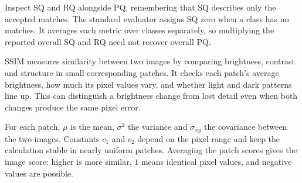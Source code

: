 \metricsecondary

Inspect SQ and RQ alongside PQ, remembering that SQ describes only the accepted matches. The standard evaluator assigns SQ zero when a class has no matches. It averages each metric over classes separately, so multiplying the reported overall SQ and RQ need not recover overall PQ.


\metricend
\clearpage
\thispagestyle{cvstyle}
\label{sec:ssim}

SSIM measures similarity between two images by comparing brightness, contrast and structure in small corresponding patches. It checks each patch's average brightness, how much its pixel values vary, and whether light and dark patterns line up. This can distinguish a brightness change from lost detail even when both changes produce the same pixel error.

\begin{metricformula}
\end{metricformula}

For each patch, $\mu$ is the mean, $\sigma^2$ the variance and $\sigma_{xy}$ the covariance between the two images. Constants $c_1$ and $c_2$ depend on the pixel range and keep the calculation stable in nearly uniform patches. Averaging the patch scores gives the image score: higher is more similar, $1$ means identical pixel values, and negative values are possible.

